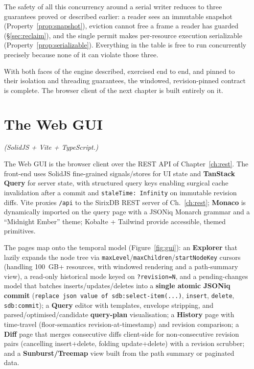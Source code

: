 \documentclass[11pt,a4paper,oneside]{report}
\theoremstyle{sirixthm}
\newcommand{\code}[1]{\texttt{#1}}
\begin{document}
\noindent The safety of all this concurrency around a serial writer reduces to three guarantees proved or
described earlier: a reader sees an immutable snapshot (Property~\ref{prop:snapshot}), eviction cannot
free a frame a reader has guarded (\S\ref{sec:reclaim}), and the single permit makes per-resource
execution serializable (Property~\ref{prop:serializable}). Everything in the table is free to run
concurrently precisely because none of it can violate those three.

With both faces of the engine described, exercised end to end, and pinned to their isolation and threading
guarantees, the windowed, revision-pinned contract is complete. The browser client of the next chapter is
built entirely on it.

\chapter{The Web GUI}
\label{ch:gui}

\noindent\textit{(SolidJS {+} Vite {+} TypeScript.)}

The Web GUI is the browser client over the REST API of Chapter~\ref{ch:rest}.
The front-end uses SolidJS fine-grained signals/stores for UI state and \textbf{TanStack Query}
for server state, with structured query keys enabling surgical cache invalidation after a
commit and \code{staleTime: Infinity} on immutable revision diffs. Vite proxies \code{/api} to
the SirixDB REST server of Ch.~\ref{ch:rest}; \textbf{Monaco} is dynamically imported on the query page with a
JSONiq Monarch grammar and a ``Midnight Ember'' theme; Kobalte {+} Tailwind provide accessible,
themed primitives.

The pages map onto the temporal model (Figure~\ref{fig:gui}): an \textbf{Explorer} that lazily
expands the node tree via \code{maxLevel}/\allowbreak\code{maxChildren}/\allowbreak\code{startNodeKey} cursors
(handling 100~GB+ resources, with windowed rendering and a path-summary view), a read-only
historical mode keyed on \code{?revision=N}, and a pending-changes model that batches
inserts/updates/deletes into a \textbf{single atomic JSONiq commit}
(\code{replace json value of sdb:select-item(...)}, \code{insert}, \code{delete},
\code{sdb:commit}); a \textbf{Query} editor with templates, envelope stripping, and
parsed/optimised/candidate \textbf{query-plan} visualisation; a \textbf{History} page with
time-travel (floor-semantics revision-at-timestamp) and revision comparison; a \textbf{Diff}
page that merges consecutive diffs client-side for non-consecutive revision pairs (cancelling
insert{+}delete, folding update{+}delete) with a revision scrubber; and a
\textbf{Sunburst/Treemap} view built from the path summary or paginated data.
\end{document}

